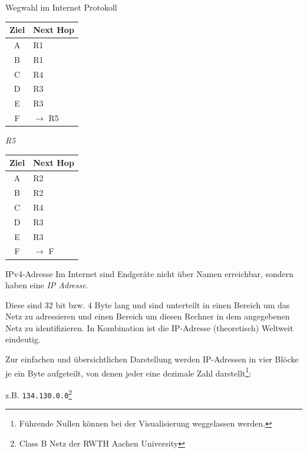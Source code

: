 \begin{example}{Wegwahl im Internet Protokoll}
\begin{minipage}{0.25\textwidth}
\begin{center}
            \begin{tabular}{|c|l|}
                \hline
                \textbf{Ziel} & \textbf{Next Hop} \\\hline
                A             & R1                \\
                B             & R1                \\
                C             & R4                \\
                D             & R3                \\
                E             & R3                \\
                F             & $\to$ R5          \\\hline
            \end{tabular}
        \end{center}
    \end{minipage}
    \begin{minipage}{0.25\textwidth}
        \begin{center}
            \emph{R5}

            \begin{tabular}{|c|l|}
                \hline
                \textbf{Ziel} & \textbf{Next Hop} \\\hline
                A             & R2                \\
                B             & R2                \\
                C             & R4                \\
                D             & R3                \\
                E             & R3                \\
                F             & $\to$ F           \\\hline
            \end{tabular}
        \end{center}
    \end{minipage}
\end{example}

\begin{defi}{IPv4-Adresse}
    Im Internet sind Endgeräte nicht über Namen erreichbar, sondern haben eine \emph{IP Adresse}.

    Diese sind 32 bit bzw. 4 Byte lang und sind unterteilt in einen Bereich um das Netz zu adressieren und einen Bereich um diesen Rechner in dem angegebenen Netz zu identifizieren.
    In Kombination ist die IP-Adresse (theoretisch) Weltweit eindeutig.

    Zur einfachen und übersichtlichen Darstellung werden IP-Adressen in vier Blöcke je ein Byte aufgeteilt, von denen jeder eine dezimale Zahl darstellt\footnote{Führende Nullen können bei der Visualisierung weggelassen werden.}:

    z.B. \texttt{134.130.0.0}\footnote{Class B Netz der RWTH Aachen University}
\end{defi}

